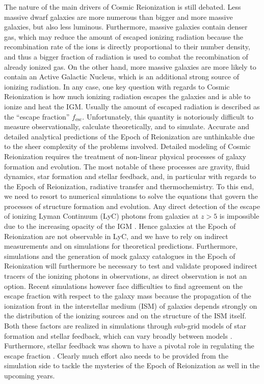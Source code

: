 The nature of the main drivers of Cosmic Reionization is still debated. Less massive dwarf galaxies are more numerous than bigger and more massive galaxies, but also less luminous. Furthermore, massive galaxies contain denser gas, which may reduce the amount of escaped ionizing radiation because the recombination rate of the ions is directly proportional to their number density, and thus a bigger fraction of radiation is used to combat the recombination of already ionized gas. On the other hand, more massive galaxies are more likely to contain an Active Galactic Nucleus, which is an additional strong source of ionizing radiation. In any case, one key question with regards to Cosmic Reionization is how much ionizing radiation escapes the galaxies and is able to ionize and heat the IGM. Usually the amount of escaped radiation is described as the ``escape fraction''
$f_{\mathrm{esc}}$. Unfortunately, this quantity is notoriously difficult to measure
observationally, calculate theoretically, and to simulate.
Accurate and detailed analytical predictions of the Epoch of Reionization are unthinkable due to
the sheer complexity of the problems involved. Detailed modeling of Cosmic Reionization requires the treatment of non-linear physical processes of galaxy formation and evolution. The most notable of these processes are gravity, fluid dynamics, star formation and stellar feedback, and, in particular with regards to the Epoch of Reionization, radiative transfer and thermochemistry. To this end, we need to resort to numerical simulations to solve the equations that govern the processes of structure formation and evolution. Any direct detection of the escape of ionizing Lyman Continuum (LyC) photons from galaxies at $z > 5$ is impossible due to the increasing opacity of the IGM \citep[e.g.][]{inoueUpdatedAnalyticModel2014}. Hence galaxies at the Epoch of Reionization are not observable in LyC, and we have to rely on indirect measurements and on simulations for theoretical predictions. Furthermore, simulations and the generation of mock galaxy catalogues in the Epoch of Reionization will furthermore be necessary to test and validate proposed indirect tracers of the ionizing photons in observations, as direct observation is not an option.
Recent simulations however face difficulties to find agreement on the escape fraction with respect
to the galaxy mass  \citep[e.g.][]{wiseBirthGalaxyIII2014a,paardekooperFirstBillionYears2015,xuGalaxyPropertiesUV2016,
rosdahlSPHINXCosmologicalSimulations2018,yehTHESANProjectIonizing2023} because the propagation of
the ionization front in the interstellar medium (ISM) of galaxies depends strongly on the
distribution of the ionizing sources and on the structure of the ISM itself. Both these factors are realized in simulations through sub-grid models of star formation and stellar feedback, which can vary broadly between models \citep[see
e.g.][]{rosdahlSnapCracklePop2017,kimAGORAHighresolutionGalaxy2016,
roca-fabregaAGORAHighresolutionGalaxy2021b}. Furthermore, stellar feedback was shown to
have a pivotal role in regulating the escape fraction  \citep{trebitschFluctuatingFeedbackregulatedEscape2017}. Clearly much effort also needs to be provided from the simulation side to tackle the mysteries of the Epoch of Reionization as well in the upcoming years.



